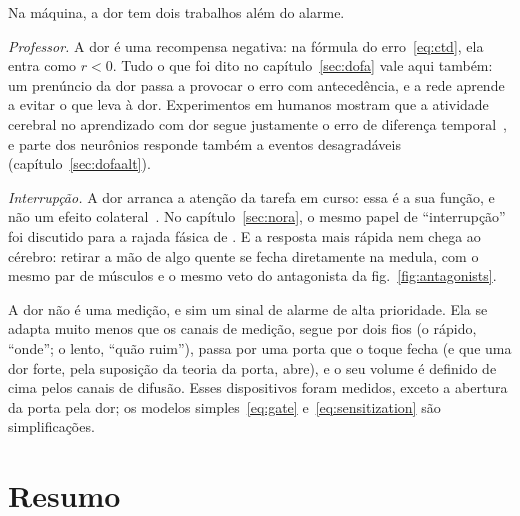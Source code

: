 Na máquina, a dor tem dois trabalhos além do alarme.

\emph{Professor.} A dor é uma recompensa negativa: na fórmula do erro~\eqref{eq:ctd}, ela entra como $r<0$. Tudo o que foi dito no capítulo~\ref{sec:dofa} vale aqui também: um prenúncio da dor passa a provocar o erro com antecedência, e a rede aprende a evitar o que leva à dor. Experimentos em humanos mostram que a atividade cerebral no aprendizado com dor segue justamente o erro de diferença temporal~\cite{Seymour2004}, e parte dos neurônios  responde também a eventos desagradáveis (capítulo~\ref{sec:dofaalt}).

\emph{Interrupção.} A dor arranca a atenção da tarefa em curso: essa é a sua função, e não um efeito colateral~\cite{EcclestonCrombez1999}. No capítulo~\ref{sec:nora}, o mesmo papel de ``interrupção'' foi discutido para a rajada fásica de . E a resposta mais rápida nem chega ao cérebro: retirar a mão de algo quente se fecha diretamente na medula, com o mesmo par de músculos e o mesmo veto do antagonista da fig.~\ref{fig:antagonists}.

\begin{keyblock}
\begin{proposition}
\label{prop:pain}
A dor não é uma medição, e sim um sinal de alarme de alta prioridade. Ela se adapta muito menos que os canais de medição, segue por dois fios (o rápido, ``onde''; o lento, ``quão ruim''), passa por uma porta que o toque fecha (e que uma dor forte, pela suposição da teoria da porta, abre), e o seu volume é definido de cima pelos canais de difusão. Esses dispositivos foram medidos, exceto a abertura da porta pela dor; os modelos simples~\eqref{eq:gate} e~\eqref{eq:sensitization} são simplificações.
\end{proposition}
\end{keyblock}

\section{Resumo}

